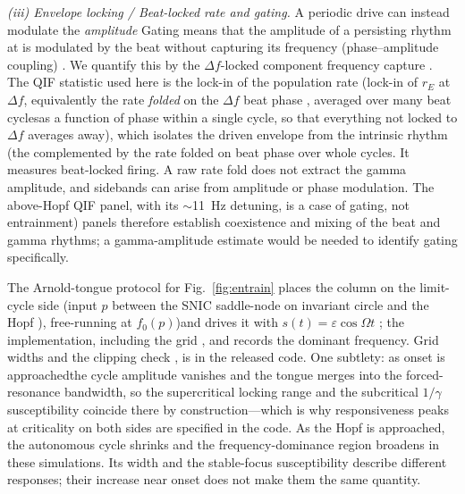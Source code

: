 \documentclass[11pt,a4paper]{article}
\providecommand{\DIFaddtex}[1]{{\protect\color{blue} \sf #1}} %
\providecommand{\DIFdeltex}[1]{{\protect\color{red} \scriptsize #1}} %
\providecommand{\DIFaddbegin}{} %
\providecommand{\DIFaddend}{} %
\providecommand{\DIFdelbegin}{} %
\providecommand{\DIFdelend}{} %
\providecommand{\DIFadd}[1]{\texorpdfstring{\DIFaddtex{#1}}{#1}} %
\providecommand{\DIFdel}[1]{\texorpdfstring{\DIFdeltex{#1}}{}} %
\begin{document}
\DIFaddend \emph{\DIFdelbegin \DIFdel{(iii) Envelope locking / }\DIFdelend \DIFaddbegin \DIFadd{Beat-locked rate and }\DIFaddend gating.} \DIFdelbegin \DIFdel{A periodic drive can instead modulate the \emph{amplitude} }\DIFdelend \DIFaddbegin \DIFadd{Gating means that the amplitude }\DIFaddend of a
persisting rhythm \DIFdelbegin \DIFdel{at }\DIFdelend \DIFaddbegin \DIFadd{is modulated by }\DIFaddend the beat without \DIFdelbegin \DIFdel{capturing its
frequency (phase--amplitude coupling) \cite{canolty2010,tort2010}. We quantify this by
the $\Delta f$-locked component }\DIFdelend \DIFaddbegin \DIFadd{frequency capture
\cite{canolty2010,tort2010}. The QIF statistic used here is the lock-in }\DIFaddend of the
population rate \DIFdelbegin \DIFdel{(lock-in of }\DIFdelend $r_E$ at $\Delta f$, \DIFdelbegin \DIFdel{equivalently the rate \emph{folded} on the $\Delta f$ beat
phase , averaged over many beat
cyclesas a function of phase within a single cycle, so that everything not locked to
$\Delta f$ averages away), which isolates the driven envelope from the intrinsic rhythm (the }\DIFdelend \DIFaddbegin \DIFadd{complemented by the rate folded on beat
phase over whole cycles. It measures beat-locked firing. A raw rate fold does
not extract the gamma amplitude, and sidebands can arise from amplitude or phase
modulation. The }\DIFaddend above-Hopf QIF \DIFdelbegin \DIFdel{panel,
with its $\sim$11~Hz detuning, is a case of gating, not entrainment)}\DIFdelend \DIFaddbegin \DIFadd{panels therefore establish coexistence and mixing
of the beat and gamma rhythms; a gamma-amplitude estimate would be needed to
identify gating specifically}\DIFaddend .

The \DIFdelbegin \DIFdel{Arnold-tongue }\DIFdelend protocol for Fig.~\ref{fig:entrain} places the column on the limit-cycle side
(input $p$ between the \DIFdelbegin \DIFdel{SNIC }\DIFdelend \DIFaddbegin \DIFadd{saddle-node on invariant circle }\DIFaddend and the Hopf\DIFaddbegin \DIFadd{)}\DIFaddend , \DIFdelbegin \DIFdel{free-running at $f_0(p)$)and }\DIFdelend drives it
with $s(t)=\varepsilon\cos\Omega t$\DIFdelbegin \DIFdel{; the implementation, including the grid }\DIFdelend \DIFaddbegin \DIFadd{, and records the dominant frequency. Grid
}\DIFaddend widths and the clipping check \DIFdelbegin \DIFdel{, is in the released code. One subtlety: as onset is approachedthe cycle amplitude vanishes and the tongue merges into the forced-resonance bandwidth, so the supercritical locking range and the subcritical $1/\gamma$ susceptibility coincide there by construction---which is why responsiveness peaks at criticality on both sides}\DIFdelend \DIFaddbegin \DIFadd{are specified in the code}\DIFaddend . \DIFaddbegin \DIFadd{As the Hopf is approached,
the autonomous cycle shrinks and the frequency-dominance region broadens in these
simulations. Its width and the stable-focus susceptibility describe different
responses; their increase near onset does not make them the same quantity.
}\DIFaddend
\end{document}
